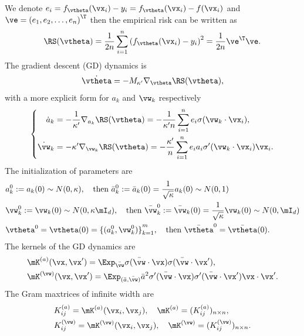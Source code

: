 \documentclass{article}
\begin{document}
We denote $e_i = f_{\vtheta}(\vx_i) - y_i = f_{\vtheta}(\vx_i) - f(\vx_i)$ and $\ve = {(e_1, e_2, \ldots, e_n)}^{\T}$ then the empirical risk can be written as
\begin{equation}
    \RS(\vtheta) = \frac{1}{2n}\sum_{i=1}^n{\left(f_{\vtheta}(\vx_i)-y_i\right)}^2 = \frac{1}{2n}\ve^{\T}\ve.
\end{equation}
The gradient descent (GD) dynamics is
\begin{equation}\label{eqn:gd_dyn}
    \dot{\vtheta} = -M_{\kappa'}\nabla_{\vtheta}\RS(\vtheta),
\end{equation}
with a more explicit form for $a_k$ and $\vw_k$ respectively
\begin{equation}
    \left \{
    \begin{aligned}
        \dot{a}_k   & = -\frac{1}{\kappa'}\nabla_{a_k}\RS(\vtheta) = -\frac{1}{\kappa'n}\sum_{i=1}^{n}e_i\sigma(\vw_k\cdot\vx_i), \\
        \dot{\vw}_k & =-\kappa'\nabla_{\vw_k}\RS(\vtheta) = -\frac{\kappa'}{n}\sum_{i=1}^n e_i a_i\sigma'(\vw_k\cdot\vx_i)\vx_i.
    \end{aligned}
    \right.
\end{equation}
The initialization of parameters are
\begin{align}
     & a^0_k:=a_k(0)\sim N(0,\kappa),\quad\text{then }\bar{a}_k^0:=\bar{a}_k(0)=\frac{1}{\sqrt{\kappa}}a_k(0)\sim N(0,1)                     \\
     & \vw_k^0:=\vw_k(0)\sim N(0, \kappa\mI_d),\quad\text{then }\bar{\vw}_k^0:=\bar{\vw}_k(0)=\frac{1}{\sqrt{\kappa}}\vw_k(0)\sim N(0,\mI_d) \\
     & \vtheta^0 = \vtheta(0) = {\{(a_k^0, \vw_k^0)\}}_{k=1}^m, \quad\text{then }\bar{\vtheta}^0=\bar{\vtheta}(0).
\end{align}
The kernels of the GD dynamics are
\begin{equation}
    \begin{aligned}
         & \mK^{(a)}(\vx,\vx')=\Exp_{\bar{\vw}}\sigma(\bar{\vw}\cdot\vx)\sigma(\bar{\vw}\cdot\vx'),                                    \\
         & \mK^{(\vw)}(\vx,\vx')=\Exp_{(\bar{a},\bar{\vw})}\bar{a}^2\sigma'(\bar{\vw}\cdot\vx)\sigma'(\bar{\vw}\cdot\vx')\vx\cdot\vx'. \\
    \end{aligned}
\end{equation}
The Gram maxtrices of infinite width are
\begin{equation}
    \begin{aligned}
         & K^{(a)}_{ij}=\mK^{(a)}(\vx_i,\vx_j), \quad \mK^{(a)}=(K_{ij}^{(a)})_{n\times n},         \\
         & K^{(\vw)}_{ij}=\mK^{(\vw)}(\vx_i,\vx_j), \quad \mK^{(\vw)}=(K_{ij}^{(\vw)})_{n\times n}.
    \end{aligned}
\end{equation}
\end{document}

